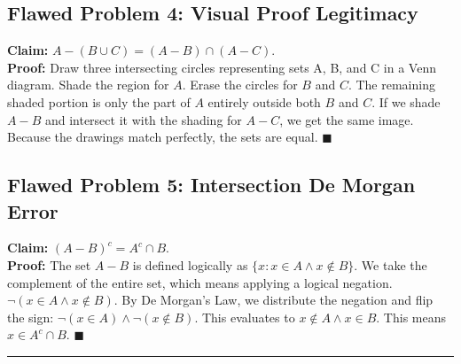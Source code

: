 \documentclass[11pt]{article}
\begin{document}
\subsection{Flawed Problem 4: Visual Proof Legitimacy}
\textbf{Claim:} $A - (B \cup C) = (A - B) \cap (A - C)$. \\
\textbf{Proof:} Draw three intersecting circles representing sets A, B, and C in a Venn diagram. Shade the region for $A$. Erase the circles for $B$ and $C$. The remaining shaded portion is only the part of $A$ entirely outside both $B$ and $C$. If we shade $A-B$ and intersect it with the shading for $A-C$, we get the same image. Because the drawings match perfectly, the sets are equal. $\blacksquare$

\subsection{Flawed Problem 5: Intersection De Morgan Error}
\textbf{Claim:} $(A - B)^c = A^c \cap B$. \\
\textbf{Proof:} The set $A - B$ is defined logically as $\{x : x \in A \land x \notin B\}$. We take the complement of the entire set, which means applying a logical negation. $\neg(x \in A \land x \notin B)$. By De Morgan's Law, we distribute the negation and flip the sign: $\neg(x \in A) \land \neg(x \notin B)$. This evaluates to $x \notin A \land x \in B$. This means $x \in A^c \cap B$. $\blacksquare$

\vspace{1cm}
\hrule
\vspace{0.5cm}
\end{document}
